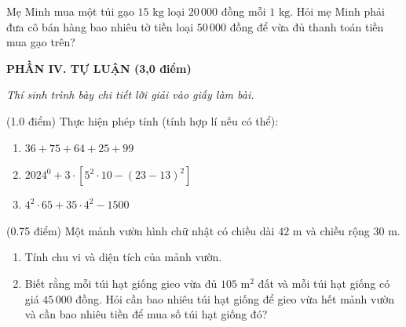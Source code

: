 \documentclass[12pt,a4paper]{article}
\begin{document}
\begin{ex}
Mẹ Minh mua một túi gạo $15\text{ kg}$ loại $20\,000$ đồng mỗi $1\text{ kg}$. Hỏi mẹ Minh phải đưa cô bán hàng bao nhiêu tờ tiền loại $50\,000$ đồng để vừa đủ thanh toán tiền mua gạo trên? 
\end{ex}


\setcounter{ex}{0}
\noindent\textbf{\large PHẦN IV. TỰ LUẬN (3,0 điểm)}

\textit{Thí sinh trình bày chi tiết lời giải vào giấy làm bài.}

\vspace{1mm}
\begin{ex} (1.0 điểm)
Thực hiện phép tính (tính hợp lí nếu có thể):
\begin{enumerate}[label=\textbf{\alph*)}, leftmargin=0.8cm, itemsep=2pt]
\item $36 + 75 + 64 + 25 + 99$
\item $2024^0 + 3 \cdot [5^2 \cdot 10 - (23 - 13)^2]$
\item $4^2 \cdot 65 + 35 \cdot 4^2 - 1500$
\end{enumerate}
\end{ex}
\vspace{1.5mm}

\begin{ex} (0.75 điểm)
Một mảnh vườn hình chữ nhật có chiều dài $42\text{ m}$ và chiều rộng $30\text{ m}$.
\begin{enumerate}[label=\textbf{\alph*)}, leftmargin=0.8cm, itemsep=2pt]
\item Tính chu vi và diện tích của mảnh vườn.
\item Biết rằng mỗi túi hạt giống gieo vừa đủ $105\text{ m}^2$ đất và mỗi túi hạt giống có giá $45\,000$ đồng. Hỏi cần bao nhiêu túi hạt giống để gieo vừa hết mảnh vườn và cần bao nhiêu tiền để mua số túi hạt giống đó?
\end{enumerate}
\end{ex}
\vspace{1.5mm}
\end{document}
